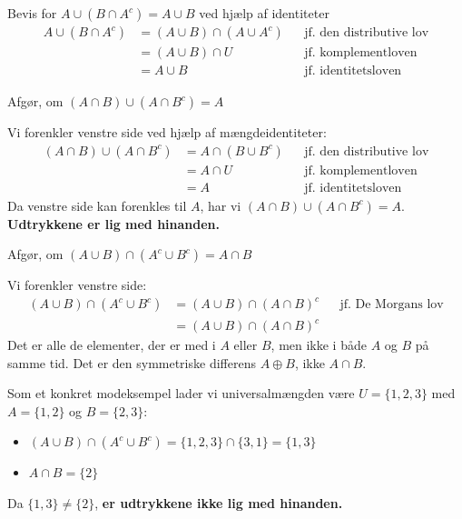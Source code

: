 \begin{example}{Bevis for $A \cup (B \cap A^c) = A \cup B$ ved hjælp af identiteter}
\begin{align*}
    A \cup (B \cap A^c) &= (A \cup B) \cap (A \cup A^c) && \text{jf. den distributive lov} \\
    &= (A \cup B) \cap U && \text{jf. komplementloven} \\
    &= A \cup B && \text{jf. identitetsloven}
\end{align*}
\end{example}

\begin{example}{Afgør, om $(A \cap B) \cup (A \cap B^c) = A$}
\begin{solution}
Vi forenkler venstre side ved hjælp af mængdeidentiteter:
\begin{align*}
    (A \cap B) \cup (A \cap B^c) &= A \cap (B \cup B^c) && \text{jf. den distributive lov} \\
    &= A \cap U && \text{jf. komplementloven} \\
    &= A && \text{jf. identitetsloven}
\end{align*}
Da venstre side kan forenkles til $A$, har vi $(A \cap B) \cup (A \cap B^c) = A$. \textbf{Udtrykkene er lig med hinanden.}
\end{solution}
\end{example}

\begin{example}{Afgør, om $(A \cup B) \cap (A^c \cup B^c) = A \cap B$}
\begin{solution}
Vi forenkler venstre side:
\begin{align*}
    (A \cup B) \cap (A^c \cup B^c) &= (A \cup B) \cap (A \cap B)^c && \text{jf. De Morgans lov} \\
    &= (A \cup B) \cap (A \cap B)^c
\end{align*}
Det er alle de elementer, der er med i $A$ eller $B$, men ikke i både $A$ og $B$ på samme tid. Det er den symmetriske differens $A \oplus B$, ikke $A \cap B$.

Som et konkret modeksempel lader vi universalmængden være $U=\{1,2,3\}$ med $A = \{1, 2\}$ og $B = \{2, 3\}$:
\begin{itemize}
    \item $(A \cup B) \cap (A^c \cup B^c) = \{1, 2, 3\} \cap \{3, 1\} = \{1, 3\}$
    \item $A \cap B = \{2\}$
\end{itemize}
Da $\{1, 3\} \neq \{2\}$, \textbf{er udtrykkene ikke lig med hinanden.}
\end{solution}
\end{example}

